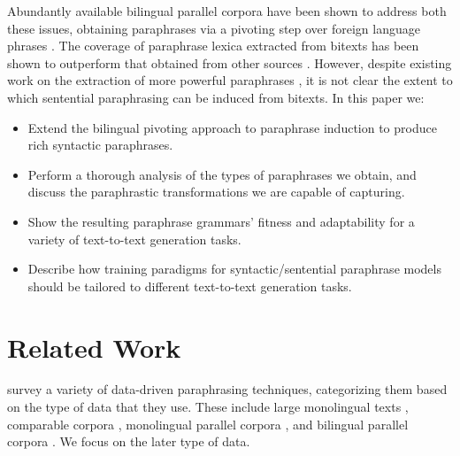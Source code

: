 \documentclass[11pt]{article}
\begin{document}
Abundantly available bilingual parallel corpora have been shown to
address both these issues, obtaining paraphrases via a pivoting step
over foreign language phrases \cite{Callison-Burch2005}. The coverage
of paraphrase lexica extracted from bitexts has been shown to
outperform that obtained from other sources \cite{Zhao2008b}. However,
despite existing work on the extraction of more powerful paraphrases
\cite{Madnani2007,Callison-Burch2008,cohn-lapata:2008,Zhao2008}, it is not clear the extent to which sentential paraphrasing can be induced from bitexts. In this paper
we:
\begin{itemize}
\item Extend the bilingual pivoting approach to paraphrase induction
  to produce rich syntactic paraphrases.
\item Perform a thorough analysis of the types of paraphrases we obtain, and discuss the
  paraphrastic transformations we are capable of capturing.
\item Show the resulting paraphrase grammars' fitness and adaptability
  for a variety of text-to-text generation tasks.
\item Describe how training paradigms for
  syntactic/sentential paraphrase models should be tailored to different text-to-text generation tasks. 
\end{itemize}


\section{Related Work} \label{related_work}

 survey a variety of data-driven paraphrasing techniques, categorizing them based on the type of data that they use.  These include large monolingual texts \cite{Lin2001,szpektor-EtAl:2004:EMNLP,Bhagat2008}, comparable corpora \cite{Barzilay2003,Dolan2004},  monolingual parallel  corpora \cite{Barzilay2001,Pang2003},  and bilingual parallel corpora \cite{Callison-Burch2005,Madnani2007,Zhao2008}.  We focus on the later type of data.
\end{document}

